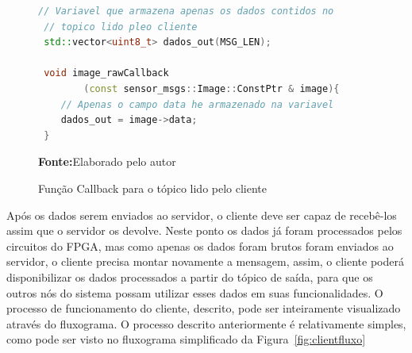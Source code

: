 \begin{figure}[ht]
\caption{Função Callback para o tópico lido pelo cliente}
\begin{center}
\begin{lstlisting}[language=C++, backgroundcolor=\color{gray!10}]
 // Variavel que armazena apenas os dados contidos no 
 // topico lido pleo cliente
 std::vector<uint8_t> dados_out(MSG_LEN);
 
 void image_rawCallback 
 		(const sensor_msgs::Image::ConstPtr & image){
 	// Apenas o campo data he armazenado na variavel
 	dados_out = image->data;
 }

\end{lstlisting}
{\small \textbf{Fonte:}Elaborado pelo autor}	
\end{center}\label{fig:codreaddata}
\end{figure}
		

Após os dados serem enviados ao servidor, o cliente deve ser capaz de recebê-los assim que o servidor os devolve. Neste ponto os dados já foram processados pelos circuitos do FPGA, mas como apenas os dados foram brutos foram enviados ao servidor, o cliente precisa montar novamente a mensagem, assim, o cliente poderá disponibilizar os dados processados a partir do tópico de saída, para que os outros nós do sistema possam utilizar esses dados em suas funcionalidades.  O processo de funcionamento do cliente, descrito, pode ser inteiramente visualizado através do fluxograma. O processo descrito anteriormente é relativamente simples, como pode ser visto no fluxograma simplificado da Figura~\ref{fig:clientfluxo}


